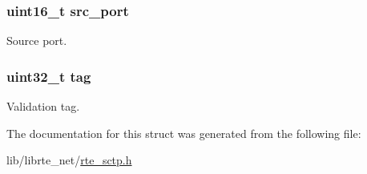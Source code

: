 \subsubsection[{src\+\_\+port}]{\setlength{\rightskip}{0pt plus 5cm}uint16\+\_\+t src\+\_\+port}\label{structsctp__hdr_ab98974981cf4c143fcee028643f313e6}
Source port. \hypertarget{structsctp__hdr_a1c50fcd1195659821729f52af8f3bb7d}{}
\subsubsection[{tag}]{\setlength{\rightskip}{0pt plus 5cm}uint32\+\_\+t tag}\label{structsctp__hdr_a1c50fcd1195659821729f52af8f3bb7d}
Validation tag. 

The documentation for this struct was generated from the following file\+:\begin{DoxyCompactItemize}
\item 
lib/librte\+\_\+net/\hyperlink{rte__sctp_8h}{rte\+\_\+sctp.\+h}\end{DoxyCompactItemize}
